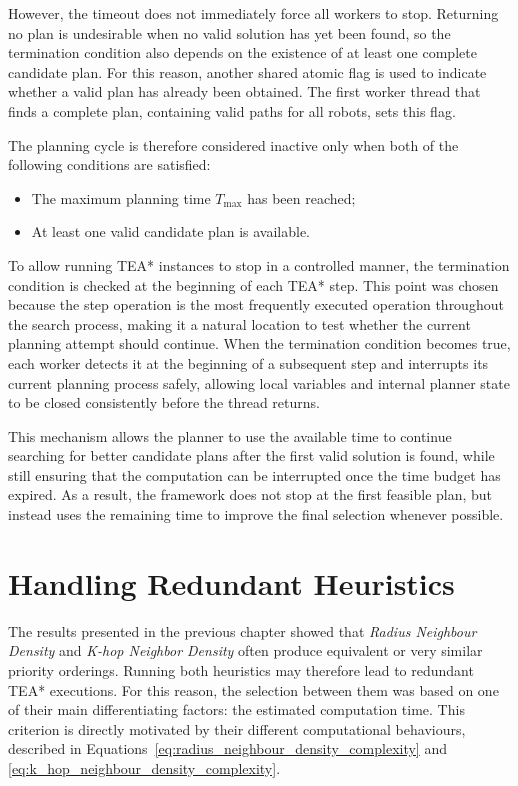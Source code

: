 However, the timeout does not immediately force all workers to stop. Returning no plan is
undesirable when no valid solution has yet been found, so the termination condition also depends
on the existence of at least one complete candidate plan. For this reason, another shared atomic
flag is used to indicate whether a valid plan has already been obtained. The first worker thread
that finds a complete plan, containing valid paths for all robots, sets this flag.

The planning cycle is therefore considered inactive only when both of the following conditions are
satisfied:

\begin{itemize}
    \item The maximum planning time \(T_{\max}\) has been reached;
    \item At least one valid candidate plan is available.
\end{itemize}

To allow running TEA* instances to stop in a controlled manner, the termination condition is
checked at the beginning of each TEA* step. This point was chosen because the step operation is
the most frequently executed operation throughout the search process, making it a natural location
to test whether the current planning attempt should continue. When the termination condition
becomes true, each worker detects it at the beginning of a subsequent step and interrupts its
current planning process safely, allowing local variables and internal planner state to be closed
consistently before the thread returns.

This mechanism allows the planner to use the available time to continue searching for better
candidate plans after the first valid solution is found, while still ensuring that the computation can
be interrupted once the time budget has expired. As a result, the framework does not stop at the
first feasible plan, but instead uses the remaining time to improve the final selection whenever
possible.


\section{Handling Redundant Heuristics}
\label{sec:redundant_heuristics}
\hspace{\parindent}
The results presented in the previous chapter showed that \textit{Radius Neighbour Density} and
\textit{K-hop Neighbor Density} often produce equivalent or very similar priority orderings. Running
both heuristics may therefore lead to redundant TEA* executions. For this reason, the selection
between them was based on one of their main differentiating factors: the estimated computation
time. This criterion is directly motivated by their different computational behaviours, described in
Equations~\ref{eq:radius_neighbour_density_complexity} and
\ref{eq:k_hop_neighbour_density_complexity}.

